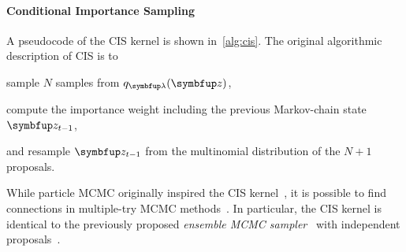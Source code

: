 \paragraph{Conditional Importance Sampling}
A pseudocode of the CIS kernel is shown in~\cref{alg:cis}.
The original algorithmic description of CIS is to
\begin{enumerate*}[label=(\roman*)]
  \item sample \(N\) samples from \(q_{\vlambda}(\vz)\),
  \item compute the importance weight including the previous Markov-chain state \(\vz_{t-1}\),
  \item and resample \(\vz_{t-1}\) from the multinomial distribution of the \(N+1\) proposals.
\end{enumerate*}
%
While particle MCMC originally inspired the CIS kernel~\citep{andrieu_particle_2010}, it is possible to find connections in multiple-try MCMC methods~\citep{martino_review_2018}.
In particular, the CIS kernel is identical to the previously proposed \textit{ensemble MCMC sampler}~\citep{austad_parallel_2007, neal_mcmc_2011a} with independent proposals~\citep[Table 12]{martino_review_2018}.

\vspace{-0.1in}

